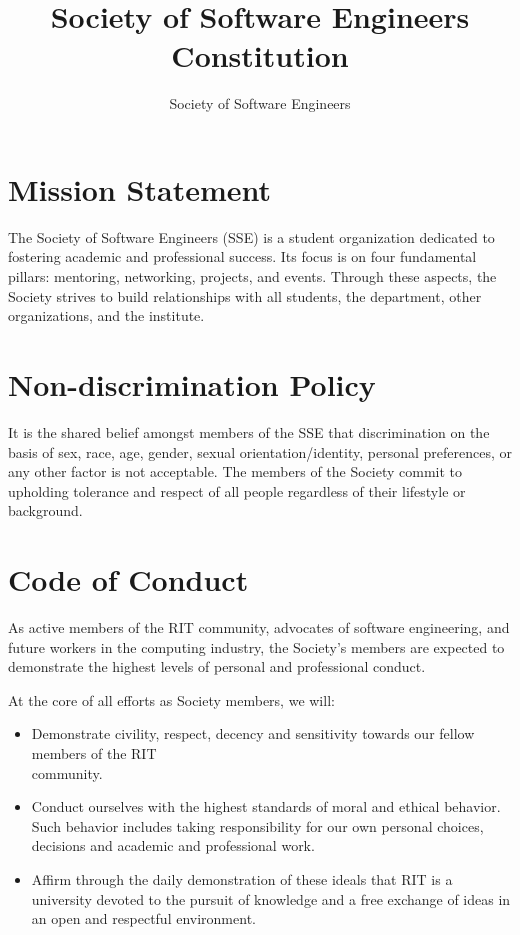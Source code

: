 \documentclass[american]{article}
\title{Society of Software Engineers Constitution}
\author{Society of Software Engineers}
\date{\datechanged}
\begin{document}
\maketitle

\section{Mission Statement}
The Society of Software Engineers (SSE) is a student organization dedicated to fostering academic and professional success. Its focus is on four fundamental pillars: mentoring, networking, projects, and events. Through these aspects, the Society strives to build relationships with all students, the department, other organizations, and the institute.

\section{Non-discrimination Policy}
It is the shared belief amongst members of the SSE that discrimination on the basis of sex, race, age, gender, sexual orientation/identity, personal preferences, or any other factor is not acceptable. The members of the Society commit to upholding tolerance and respect of all people regardless of their lifestyle or background.

\section{Code of Conduct}
As active members of the RIT community, advocates of software engineering, and future workers in the computing industry, the Society's members are expected to demonstrate the highest levels of personal and professional conduct.

At the core of all efforts as Society members, we will:

\begin{itemize}
\item Demonstrate civility, respect, decency and sensitivity towards our fellow members of the RIT \\ community.
\item Conduct ourselves with the highest standards of moral and ethical behavior. Such behavior includes taking responsibility for our own personal choices, decisions and academic and professional work.
\item Affirm through the daily demonstration of these ideals that RIT is a university devoted to the pursuit of knowledge and a free exchange of ideas in an open and respectful environment.
\end{itemize}
\end{document}
